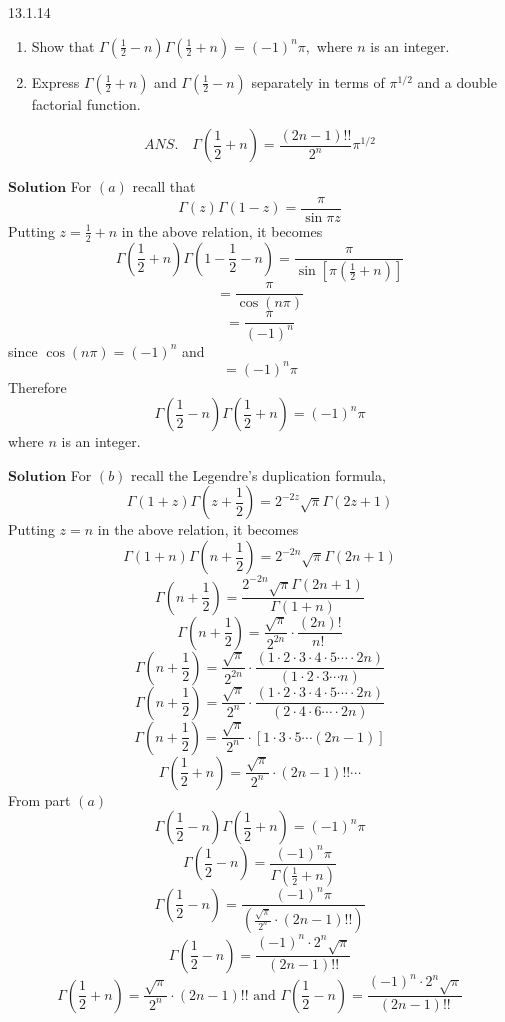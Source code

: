 \documentclass{article}
\begin{document}
\begin{flushleft}
\newpage

\begin{mybox}{13.1.14}
\begin{enumerate}[$(a)$]
\item Show that $\Gamma\left(\frac{1}{2}-n\right) \Gamma\left(\frac{1}{2}+n\right)=(-1)^{n} \pi,$ where $n$ is an integer. 
\item Express $\Gamma\left(\frac{1}{2}+n\right)$ and $\Gamma\left(\frac{1}{2}-n\right)$ separately in terms of $\pi^{1 / 2}$ and a double factorial function.
\end{enumerate}
$$
A N S . \quad \Gamma\left(\frac{1}{2}+n\right)=\frac{(2 n-1) ! !}{2^{n}} \pi^{1 / 2}
$$
\end{mybox}

$\boxed{\textbf{Solution}}$ For $(a)$ recall that 
$$\Gamma(z) \Gamma(1-z)=\frac{\pi}{\sin \pi z}$$
Putting $z=\frac{1}{2}+n$ in the above relation, it becomes
$$
\Gamma\left(\frac{1}{2}+n\right) \Gamma\left(1-\frac{1}{2}-n\right)=\frac{\pi}{\sin \left[\pi\left(\frac{1}{2}+n\right)\right]}
$$
$$
=\frac{\pi}{\cos (n \pi)}
$$
$$
=\frac{\pi}{(-1)^{n}}
$$
since $\cos (n \pi)=(-1)^{n}$ and
$$
=(-1)^{n} \pi
$$
Therefore 
$$\Gamma\left(\frac{1}{2}-n\right) \Gamma\left(\frac{1}{2}+n\right)=(-1)^{n} \pi$$ where $n$ is an integer.

$\boxed{\textbf{Solution}}$ For $(b)$ recall the Legendre's duplication formula,
$$\Gamma(1+z) \Gamma\left(z+\frac{1}{2}\right)=2^{-2 z} \sqrt{\pi} \Gamma(2 z+1)$$
Putting $z=n$ in the above relation, it becomes
$$\Gamma(1+n) \Gamma\left(n+\frac{1}{2}\right)=2^{-2 n} \sqrt{\pi} \Gamma(2 n+1)$$
$$\Gamma\left(n+\frac{1}{2}\right)=\frac{2^{-2 n} \sqrt{\pi} \Gamma(2 n+1)}{\Gamma(1+n)}$$
$$\Gamma\left(n+\frac{1}{2}\right)=\frac{\sqrt{\pi}}{2^{2 n}} \cdot \frac{(2 n) !}{n! \ }$$
$$\Gamma\left(n+\frac{1}{2}\right)=\frac{\sqrt{\pi}}{2^{2 n}} \cdot \frac{(1 \cdot 2  \cdot 3  \cdot 4  \cdot 5   \cdots   \cdot 2 n)}{(1 \cdot 2  \cdot 3  \cdots n)}$$
$$\Gamma\left(n+\frac{1}{2}\right)=\frac{\sqrt{\pi}}{2^{n}} \cdot \frac{(1 \cdot 2  \cdot 3  \cdot 4  \cdot 5   \cdots   \cdot 2 n)}{(2 \cdot 4  \cdot 6   \cdots   \cdot 2 n)}$$
$$\Gamma\left(n+\frac{1}{2}\right)=\frac{\sqrt{\pi}}{2^{n}} \cdot[1 \cdot 3  \cdot 5   \cdots (2 n-1)]$$
$$
\Gamma\left(\frac{1}{2}+n\right)=\frac{\sqrt{\pi}}{2^{n}} \cdot(2 n-1) ! ! \cdots
$$
From part $(a)$ 
$$
\Gamma\left(\frac{1}{2}-n\right) \Gamma\left(\frac{1}{2}+n\right)=(-1)^{n} \pi
$$
$$\Gamma\left(\frac{1}{2}-n\right)=\frac{(-1)^{n} \pi}{\Gamma\left(\frac{1}{2}+n\right)}$$
$$\Gamma\left(\frac{1}{2}-n\right)=\frac{(-1)^{n} \pi}{\left(\frac{\sqrt{\pi}}{2^{n}} \cdot(2 n-1) ! !\right)}$$
$$
\Gamma\left(\frac{1}{2}-n\right)=\frac{(-1)^{n} \cdot 2^{n} \sqrt{\pi}}{(2 n-1) ! !}
$$
$$
\Gamma\left(\frac{1}{2}+n\right)=\frac{\sqrt{\pi}}{2^{n}} \cdot(2 n-1) ! ! \text { and } \Gamma\left(\frac{1}{2}-n\right)=\frac{(-1)^{n} \cdot 2^{n} \sqrt{\pi}}{(2 n-1) ! !}
$$


\end{flushleft}
\end{document}
